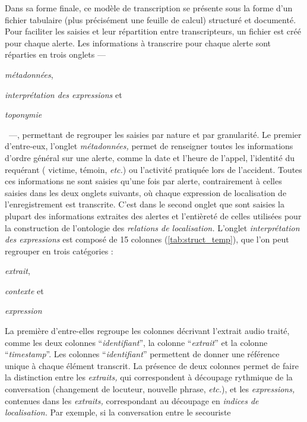 Dans sa forme finale, ce modèle de transcription se présente sous la
forme d'un fichier tabulaire (plus précisément une feuille de calcul)
structuré et documenté. Pour faciliter les saisies et leur répartition
entre transcripteurs, un fichier est créé pour chaque alerte.
%
Les informations à transcrire pour chaque alerte sont réparties en
trois onglets
%
---~\begin{enumerate*}[label=(\alph*)]
\item \emph{métadonnées},
\item \emph{interprétation des expressions} et
\item \emph{toponymie}
\end{enumerate*}~---,
%
permettant de regrouper les saisies par nature et par granularité.
%
Le premier d'entre-eux, l'onglet \emph{métadonnées,} permet de
renseigner toutes les informations d'ordre général sur une alerte,
comme la date et l'heure de l'appel, l'identité du requérant (\eg
victime, témoin, \emph{etc.}) ou l’activité pratiquée lors de
l'accident. Toutes ces informations ne sont saisies qu'une fois par
alerte, contrairement à celles saisies dans les deux onglets suivants,
où chaque expression de localisation de l'enregistrement est
transcrite. C'est dans le second onglet que sont saisies la plupart
des informations extraites des alertes et l’entièreté de celles
utilisées pour la construction de l'ontologie des \emph{relations de
  localisation.} L'onglet \emph{interprétation des expressions} est
composé de 15 colonnes (\autoref{tab:struct_temp}), que l'on peut
regrouper en trois catégories :
%
\begin{enumerate*}[label=(\alph*)]
\item \emph{extrait},
\item \emph{contexte} et
\item \emph{expression}
\end{enumerate*}
%
La première d'entre-elles regroupe les colonnes décrivant l'extrait
audio traité, comme les deux colonnes \enquote{\emph{identifiant}}, la
colonne \enquote{\emph{extrait}} et la colonne
\enquote{\emph{timestamp}}. Les colonnes \enquote{\emph{identifiant}}
permettent de donner une référence unique à chaque élément
transcrit. La présence de deux colonnes permet de faire la distinction
entre les \emph{extraits,} qui correspondent à découpage rythmique de
la conversation (changement de locuteur, nouvelle phrase,
\emph{etc.}), et les \emph{expressions,} contenues dans les
\emph{extraits,} correspondant au découpage en \emph{indices de
  localisation.} Par exemple, si la conversation entre le secouriste
